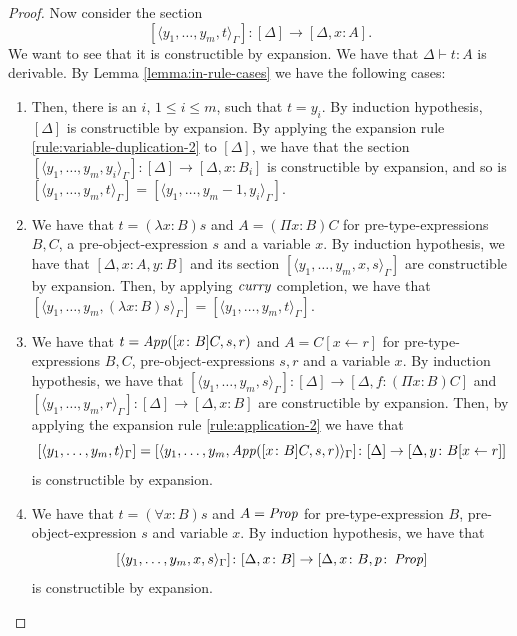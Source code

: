 \begin{proof}
    Now consider the section \[
        [\langle y_1, \dots, y_m, t \rangle_\Gamma] \colon [\Delta] \to [\Delta, x \colon A].
    \] 
    We want to see that it is constructible by expansion. We have that $\Delta \vdash t \colon A$ is derivable.
    By Lemma \ref{lemma:in-rule-cases} we have the following cases:
    \begin{enumerate}
        \item Then, there is an $i$, $1 \leq i \leq m$, such that $t = y_i$. By induction hypothesis, $[\Delta]$ is constructible by expansion. 
            By applying the expansion rule \ref{rule:variable-duplication-2} to $[\Delta]$, we have that the section $[\langle y_1, \dots, y_m, y_i \rangle_\Gamma] \colon [\Delta] \to [\Delta, x \colon B_i]$ is constructible by expansion,
            and so is $[\langle y_1, \dots, y_m, t \rangle_\Gamma] = [\langle y_1, \dots, y_m-1, y_i \rangle_\Gamma]$.
        \item We have that $t = (\lambda x \colon B) s$ and $A = (\Pi x \colon B) C$ for pre-type-expressions $B, C$, a pre-object-expression $s$ and a variable $x$.
            By induction hypothesis, we have that $[\Delta, x \colon A, y \colon B]$ and its section $[\langle y_1, \dots, y_m, x, s \rangle_\Gamma]$ are constructible by expansion.
            Then, by applying $\operatorname{\mathit{curry}}$ completion, we have that $[\langle y_1, \dots, y_m, (\lambda x \colon B) s \rangle_\Gamma] = [\langle y_1, \dots, y_m, t \rangle_\Gamma]$.
        \item We have that $t = \operatorname{\mathit{App}}([x \colon B] C, s, r)$ and $A = C[x \leftarrow r]$ for pre-type-expressions $B, C$, pre-object-expressions $s, r$ and a variable $x$.
            By induction hypothesis, we have that $[\langle y_1, \dots, y_m, s \rangle_\Gamma] \colon [\Delta] \to [\Delta, f \colon (\Pi x \colon B)C]$ and $[\langle y_1, \dots, y_m, r \rangle_\Gamma] \colon [\Delta] \to [\Delta, x \colon B]$
            are constructible by expansion. Then, by applying the expansion rule \ref{rule:application-2} we have that \[
                [\langle y_1, \dots, y_m, t \rangle_\Gamma] = [\langle y_1, \dots, y_m, \operatorname{\mathit{App}}([x \colon B]C, s, r)\rangle_\Gamma] \colon [\Delta] \to [\Delta, y \colon B[x \leftarrow r]]
            \]
            is constructible by expansion.
        \item We have that $t = (\forall x \colon B) s$ and $A = \operatorname{\mathit{Prop}}$ for pre-type-expression $B$, pre-object-expression $s$ and variable $x$.
            By induction hypothesis, we have that $$[\langle y_1, \dots, y_m, x, s \rangle_\Gamma] \colon [\Delta, x \colon B] \to [\Delta, x \colon B, p \colon \operatorname{\mathit{Prop}}]$$ is constructible by expansion.

\end{enumerate}
\end{proof}
